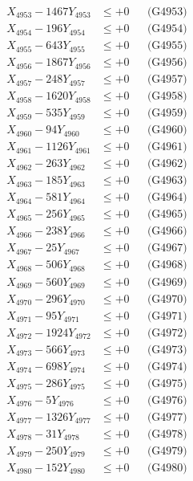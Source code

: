 \documentclass[a4paper,10pt]{article}
\begin{document}
{\begin{align}
X_{4953} - 1467Y_{4953} &\leq +0 && \text{(G4953)} \\
X_{4954} - 196Y_{4954} &\leq +0 && \text{(G4954)} \\
X_{4955} - 643Y_{4955} &\leq +0 && \text{(G4955)} \\
X_{4956} - 1867Y_{4956} &\leq +0 && \text{(G4956)} \\
X_{4957} - 248Y_{4957} &\leq +0 && \text{(G4957)} \\
X_{4958} - 1620Y_{4958} &\leq +0 && \text{(G4958)} \\
X_{4959} - 535Y_{4959} &\leq +0 && \text{(G4959)} \\
X_{4960} - 94Y_{4960} &\leq +0 && \text{(G4960)} \\
\allowbreak
X_{4961} - 1126Y_{4961} &\leq +0 && \text{(G4961)} \\
X_{4962} - 263Y_{4962} &\leq +0 && \text{(G4962)} \\
X_{4963} - 185Y_{4963} &\leq +0 && \text{(G4963)} \\
X_{4964} - 581Y_{4964} &\leq +0 && \text{(G4964)} \\
X_{4965} - 256Y_{4965} &\leq +0 && \text{(G4965)} \\
X_{4966} - 238Y_{4966} &\leq +0 && \text{(G4966)} \\
X_{4967} - 25Y_{4967} &\leq +0 && \text{(G4967)} \\
X_{4968} - 506Y_{4968} &\leq +0 && \text{(G4968)} \\
X_{4969} - 560Y_{4969} &\leq +0 && \text{(G4969)} \\
X_{4970} - 296Y_{4970} &\leq +0 && \text{(G4970)} \\
\allowbreak
X_{4971} - 95Y_{4971} &\leq +0 && \text{(G4971)} \\
X_{4972} - 1924Y_{4972} &\leq +0 && \text{(G4972)} \\
X_{4973} - 566Y_{4973} &\leq +0 && \text{(G4973)} \\
X_{4974} - 698Y_{4974} &\leq +0 && \text{(G4974)} \\
X_{4975} - 286Y_{4975} &\leq +0 && \text{(G4975)} \\
X_{4976} - 5Y_{4976} &\leq +0 && \text{(G4976)} \\
X_{4977} - 1326Y_{4977} &\leq +0 && \text{(G4977)} \\
X_{4978} - 31Y_{4978} &\leq +0 && \text{(G4978)} \\
X_{4979} - 250Y_{4979} &\leq +0 && \text{(G4979)} \\
X_{4980} - 152Y_{4980} &\leq +0 && \text{(G4980)} \\

\end{align}}
\end{document}
